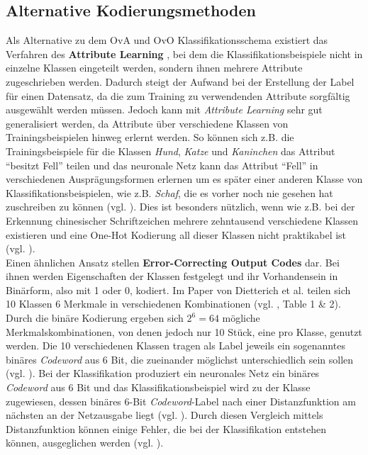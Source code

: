 \newpage
\subsection{Alternative Kodierungsmethoden}
Als Alternative zu dem OvA und OvO Klassifikationsschema existiert das Verfahren des \textbf{Attribute Learning} \cite{attributeLearning, attributeLearningChinese}, bei dem die Klassifikationsbeispiele nicht in einzelne Klassen eingeteilt werden, sondern ihnen mehrere Attribute zugeschrieben werden. Dadurch steigt der Aufwand bei der Erstellung der Label für einen Datensatz, da die zum Training zu verwendenden Attribute sorgfältig ausgewählt werden müssen. Jedoch kann mit \textit{Attribute Learning} sehr gut generalisiert werden, da Attribute über verschiedene Klassen von Trainingsbeispielen hinweg erlernt werden. So können sich z.B. die Trainingsbeispiele für die Klassen \textit{Hund}, \textit{Katze} und \textit{Kaninchen} das Attribut \enquote{besitzt Fell} teilen und das neuronale Netz kann das Attribut \enquote{Fell} in verschiedenen Ausprägungsformen erlernen um es  später einer anderen Klasse von Klassifikationsbeispielen, wie z.B. \textit{Schaf}, die es vorher noch nie gesehen hat zuschreiben zu können (vgl. \cite{attributeLearning}). Dies ist besonders nützlich, wenn wie z.B. bei der Erkennung chinesischer Schriftzeichen mehrere zehntausend verschiedene Klassen existieren und eine One-Hot Kodierung all dieser Klassen nicht praktikabel ist (vgl. \cite{attributeLearningChinese}).\\

Einen ähnlichen Ansatz stellen \textbf{Error-Correcting Output Codes} \cite{errorCorrectingCodes} dar. Bei ihnen werden Eigenschaften der Klassen festgelegt und ihr Vorhandensein in Binärform, also mit 1 oder 0, kodiert. Im Paper von Dietterich et al. \cite{errorCorrectingCodes} teilen sich 10 Klassen 6 Merkmale in verschiedenen Kombinationen (vgl. \cite{errorCorrectingCodes}, Table 1 \& 2). Durch die binäre Kodierung ergeben sich $2^6 = 64$ mögliche Merkmalskombinationen, von denen jedoch nur 10 Stück, eine pro Klasse, genutzt werden. Die 10 verschiedenen Klassen tragen als Label jeweils ein sogenanntes binäres \textit{Codeword} aus 6 Bit, die zueinander möglichst unterschiedlich sein sollen (vgl. \cite{errorCorrectingCodes}). Bei der Klassifikation produziert ein neuronales Netz ein binäres \textit{Codeword} aus 6 Bit und das Klassifikationsbeispiel wird zu der Klasse zugewiesen, dessen binäres 6-Bit \textit{Codeword}-Label nach einer Distanzfunktion am nächsten an der Netzausgabe liegt (vgl. \cite{errorCorrectingCodes}). Durch diesen Vergleich mittels Distanzfunktion können einige Fehler, die bei der Klassifikation entstehen können, ausgeglichen werden (vgl. \cite{errorCorrectingCodes}).\\


